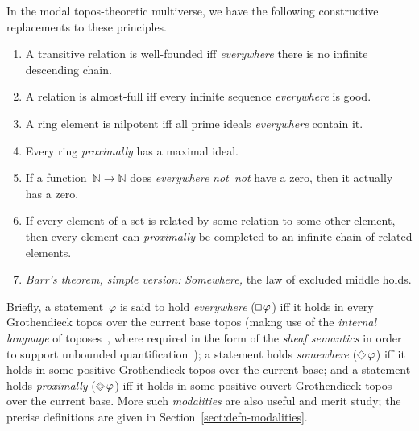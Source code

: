 \documentclass[oneside,reqno]{amsart}
\theoremstyle{definition}
\theoremstyle{plain}
\theoremstyle{remark}
\newcommand{\NN}{\mathbb{N}}
\renewcommand{\_}{\mathpunct{.}\,}
\newcommand{\notnot}{\emph{not~not}\xspace}
\DeclareMathOperator{\possible}{\text{\tikz[scale=.6ex/1cm,baseline=-.6ex,rotate=45,line width=.1ex]{\draw (-1,-1) rectangle (1,1);}}}
\DeclareMathOperator{\necessary}{\text{\tikz[scale=.6ex/1cm,baseline=-.6ex,line width=.1ex]{\draw (-1,-1) rectangle (1,1);}}}
\DeclareMathOperator{\xpossible}{\text{\tikz[scale=.6ex/1cm,baseline=-.6ex,rotate=45,line width=.1ex]{\draw (-1,-1) rectangle (1,1); \draw[very thin] (-.6,-.6) rectangle (.6,.6);}}}
\newcommand{\?}{\,{:}\,}
\begin{document}
In the modal topos-theoretic multiverse, we have the following constructive
replacements to these principles.
\begin{enumerate}
\item A transitive relation is well-founded iff \emph{everywhere} there is no infinite descending
chain.
\item A relation is almost-full iff every infinite sequence \emph{everywhere} is good.
\item A ring element is nilpotent iff all prime
ideals \emph{everywhere} contain it.
\item Every ring \emph{proximally} has a maximal ideal.
\item If a function~$\NN \to \NN$ does \emph{everywhere} \notnot have
a zero, then it actually has a zero.
\item If every element of a set is related by some relation to some other
element, then every element can \emph{proximally} be completed to an infinite chain
of related elements.
\item \emph{Barr's theorem, simple version:} \emph{Somewhere,} the law of
excluded middle holds.
\end{enumerate}

Briefly, a statement~$\varphi$ is said to hold \emph{everywhere}
($\necessary\varphi$) iff it holds in every Grothendieck topos over the
current base topos (makng use of the \emph{internal language} of
toposes~\cite{xxx}, where required in the form of the \emph{sheaf semantics} in
order to support unbounded quantification~\cite{xxx}); a statement holds \emph{somewhere} ($\possible\varphi$)
iff it holds in some positive Grothendieck topos over the current base; and a
statement holds \emph{proximally} ($\xpossible\varphi$) iff it holds in
some positive ouvert Grothendieck topos over the current base. More such
\emph{modalities} are also useful and merit study; the precise definitions are
given in Section~\ref{sect:defn-modalities}.
\end{document}
